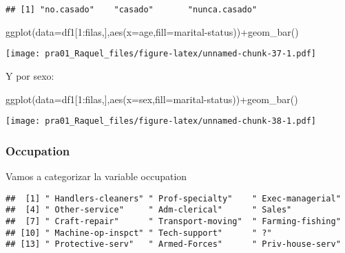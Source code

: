 \documentclass[]{article}
\newenvironment{Shaded}{\begin{snugshade}}{\end{snugshade}}
\newcommand{\DataTypeTok}[1]{\textcolor[rgb]{0.87,0.87,0.75}{#1}}
\newcommand{\DecValTok}[1]{\textcolor[rgb]{0.86,0.86,0.80}{#1}}
\newcommand{\KeywordTok}[1]{\textcolor[rgb]{0.94,0.87,0.69}{#1}}
\newcommand{\NormalTok}[1]{\textcolor[rgb]{0.80,0.80,0.80}{#1}}
\newcommand{\OperatorTok}[1]{\textcolor[rgb]{0.94,0.94,0.82}{#1}}
\newcommand{\StringTok}[1]{\textcolor[rgb]{0.80,0.58,0.58}{#1}}
\begin{document}
\begin{verbatim}
## [1] "no.casado"    "casado"       "nunca.casado"
\end{verbatim}

\begin{Shaded}
\begin{Highlighting}[]
\KeywordTok{ggplot}\NormalTok{(}\DataTypeTok{data=}\NormalTok{df1[}\DecValTok{1}\OperatorTok{:}\NormalTok{filas,],}\KeywordTok{aes}\NormalTok{(}\DataTypeTok{x=}\NormalTok{age,}\DataTypeTok{fill=}\StringTok{\textasciigrave{}}\DataTypeTok{marital{-}status}\StringTok{\textasciigrave{}}\NormalTok{))}\OperatorTok{+}\KeywordTok{geom\_bar}\NormalTok{()}
\end{Highlighting}
\end{Shaded}

\texttt{[image: pra01\_Raquel\_files/figure-latex/unnamed-chunk-37-1.pdf]}

Y por sexo:

\begin{Shaded}
\begin{Highlighting}[]
\KeywordTok{ggplot}\NormalTok{(}\DataTypeTok{data=}\NormalTok{df1[}\DecValTok{1}\OperatorTok{:}\NormalTok{filas,],}\KeywordTok{aes}\NormalTok{(}\DataTypeTok{x=}\NormalTok{sex,}\DataTypeTok{fill=}\StringTok{\textasciigrave{}}\DataTypeTok{marital{-}status}\StringTok{\textasciigrave{}}\NormalTok{))}\OperatorTok{+}\KeywordTok{geom\_bar}\NormalTok{()}
\end{Highlighting}
\end{Shaded}

\texttt{[image: pra01\_Raquel\_files/figure-latex/unnamed-chunk-38-1.pdf]}

\hypertarget{occupation}{%
\subsubsection{Occupation}\label{occupation}}

Vamos a categorizar la variable occupation

\begin{Shaded}
\end{Shaded}

\begin{verbatim}
##  [1] " Handlers-cleaners" " Prof-specialty"    " Exec-managerial"  
##  [4] " Other-service"     " Adm-clerical"      " Sales"            
##  [7] " Craft-repair"      " Transport-moving"  " Farming-fishing"  
## [10] " Machine-op-inspct" " Tech-support"      " ?"                
## [13] " Protective-serv"   " Armed-Forces"      " Priv-house-serv"
\end{verbatim}
\end{document}

